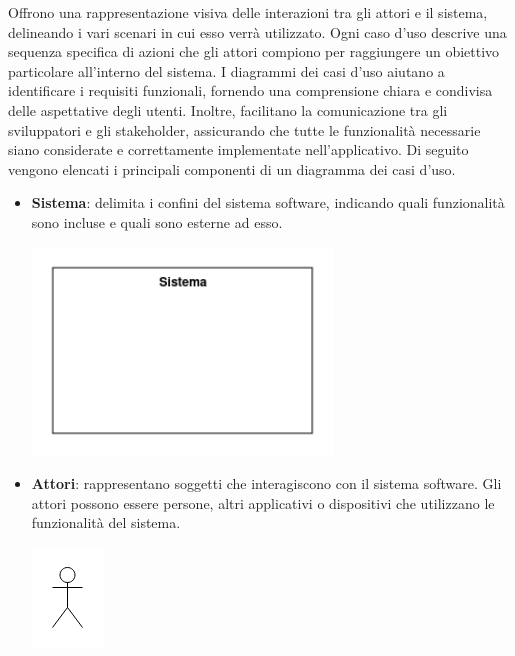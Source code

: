Offrono una rappresentazione visiva delle interazioni tra gli attori e il sistema, delineando i vari scenari in cui esso verrà utilizzato. Ogni caso d'uso descrive una sequenza specifica di azioni che gli attori compiono per raggiungere un obiettivo particolare all'interno del sistema. I diagrammi dei casi d'uso aiutano a identificare i requisiti funzionali, fornendo una comprensione chiara e condivisa delle aspettative degli utenti. Inoltre, facilitano la comunicazione tra gli sviluppatori e gli stakeholder, assicurando che tutte le funzionalità necessarie siano considerate e correttamente implementate nell'applicativo.
Di seguito vengono elencati i principali componenti di un diagramma dei casi d'uso.
\begin{itemize}
	\item \textbf{Sistema}: delimita i confini del sistema software, indicando quali funzionalità sono incluse e quali sono esterne ad esso.
	      \begin{center}
		      \includegraphics*[width=8cm]{../../../images/norme_di_progetto/sistema.png}
	      \end{center}
	\item \textbf{Attori}: rappresentano soggetti che interagiscono con il sistema software. Gli attori possono essere persone, altri applicativi o dispositivi che utilizzano le funzionalità del sistema.
	      \begin{center}
		      \includegraphics*[heigth=2.5cm]{../../../images/norme_di_progetto/attore.png}
	      \end{center}

\end{itemize}
